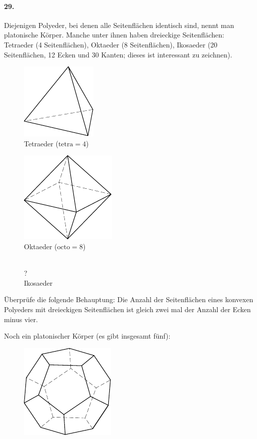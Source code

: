 \documentclass[10pt,a5paper,twoside]{article}
\newenvironment{problem}[1]{\paragraph*{#1}}{}
\begin{document}
\begin{problem}{29.}
	Diejenigen Polyeder, bei denen alle Seitenflächen identisch sind, nennt man platonische Körper. Manche unter ihnen haben dreieckige Seitenflächen: Tetraeder (4 Seitenflächen), Oktaeder (8 Seitenflächen), Ikosaeder (20 Seitenflächen, 12 Ecken und 30 Kanten; dieses ist interessant zu zeichnen). 
	\begin{figure}[H]
	\centering
	\footnotesize
	\null\hfill
	\parbox{0.3\linewidth}{\centering\includegraphics[scale=1]{taskbook-131}\\Tetraeder ($\text{tetra}= 4$)}
	\hfill
	\parbox{0.3\linewidth}{\centering\includegraphics[scale=1]{taskbook-132}\\Oktaeder ($\text{octo}= 8$)}
	\hfill\null\\
	{\Huge ?}\\Ikosaeder
	\end{figure}
	Überprüfe die folgende Behauptung: Die Anzahl der Seitenflächen eines konvexen Polyeders mit dreieckigen Seitenflächen ist gleich zwei mal der Anzahl der Ecken minus vier. 

	Noch ein platonischer Körper (es gibt insgesamt fünf):
	\begin{figure}[H]
	\centering
	\includegraphics{taskbook-14}
	\end{figure}
\end{problem}
\end{document}
